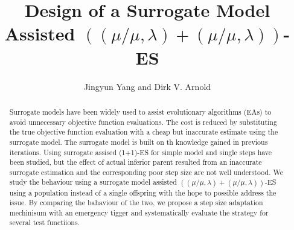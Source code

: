 \documentclass[sigconf,natbib=false]{acmart}
\begin{document}
\title{Design of a Surrogate Model Assisted $((\mu/\mu,\lambda)+(\mu/\mu,\lambda))$-ES}


\author{Jingyun Yang and Dirk V. Arnold}
\orcid{}






\begin{abstract}
Surrogate models have been widely used to assist evolutionary algorithms (EAs) to avoid unnecessary objective function evaluations. The cost is reduced by substituting the true objective function evaluation with a cheap but inaccurate estimate using the surrogate model. The surrogate model is built on th knowledge gained in previous iterations. Using surrogate assised (1+1)-ES for simple model and single steps have been studied, but the effect of actual inferior parent resulted from an inaccurate surrogate estimation and the corresponding poor step size are not well understood. We study the behaviour using a surrogate model assisted $((\mu/\mu,\lambda)+(\mu/\mu,\lambda))$-ES using a population instead of a single offspring with the hope to possible address the issue. By comparing the bahaviour of the two, we propose a step size adaptation mechinisum with an emergency tigger and systematically evaluate the strategy for several test functiions.
\end{abstract}
\end{document}
